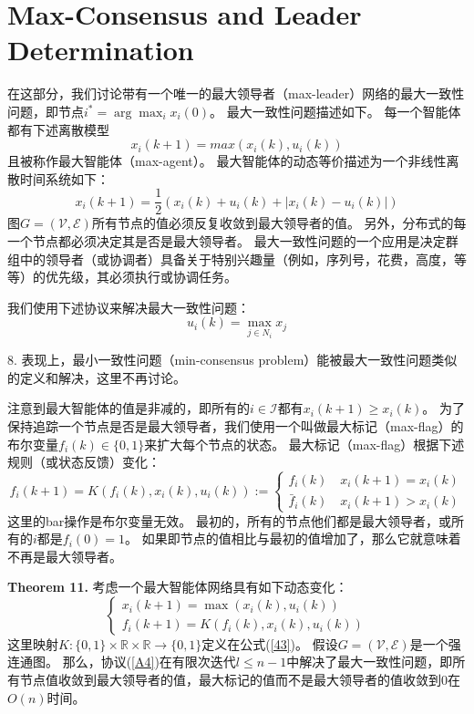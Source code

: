 \documentclass{article}
\begin{document}
\section{Max-Consensus and Leader Determination}
在这部分，我们讨论带有一个唯一的最大领导者（max-leader）网络的最大一致性问题，即节点$i^*=\arg\max_ix_i(0)$。
最大一致性问题描述如下。
每一个智能体都有下述离散模型
\begin{equation}
    \tag{41}
    \label{41}
    x_i(k+1)=max(x_i(k),u_i(k))
\end{equation}
且被称作最大智能体（max-agent）。
最大智能体的动态等价描述为一个非线性离散时间系统如下：
\begin{equation}
    \tag{42}
    \label{42}
    x_i(k+1) = \frac{1}{2}(x_i(k)+u_i(k)+|x_i(k)-u_i(k)|)
\end{equation}
图$G=(\mathcal{V},\mathcal{E})$所有节点的值必须反复收敛到最大领导者的值。
另外，分布式的每一个节点都必须决定其是否是最大领导者。
最大一致性问题的一个应用是决定群组中的领导者（或协调者）具备关于特别兴趣量（例如，序列号，花费，高度，等等）的优先级，其必须执行或协调任务。

我们使用下述协议来解决最大一致性问题：
\begin{equation}
    \tag{A4}
    \label{A4}
    u_i(k) = \max_{j\in N_i}x_j
\end{equation}

 8. 表现上，最小一致性问题（min-consensus problem）能被最大一致性问题类似的定义和解决，这里不再讨论。

注意到最大智能体的值是非减的，即所有的$i\in\mathcal{I}$都有$x_i(k+1)\ge x_i(k)$。
为了保持追踪一个节点是否是最大领导者，我们使用一个叫做最大标记（max-flag）的布尔变量$f_i(k)\in\{0,1\}$来扩大每个节点的状态。
最大标记（max-flag）根据下述规则（或状态反馈）变化：
\begin{equation}
    \tag{43}
    \label{43}
    f_i(k+1) = K(f_i(k),x_i(k),u_i(k)):=
    \left\{
        \begin{matrix}
            f_i(k)\quad x_i(k+1)=x_i(k)\\
            \bar{f}_i(k) \quad x_i(k+1)>x_i(k)
        \end{matrix}
    \right.
\end{equation}
这里的bar操作是布尔变量无效。
最初的，所有的节点他们都是最大领导者，或所有的$i$都是$f_i(0)=1$。
如果即节点的值相比与最初的值增加了，那么它就意味着不再是最大领导者。

\noindent\textbf{Theorem 11.} 考虑一个最大智能体网络具有如下动态变化：
\begin{equation}
    \tag{44}
    \label{44}
    \left\{
        \begin{matrix}
            x_i(k+1) = \max(x_i(k),u_i(k))\\
            f_i(k+1) = K(f_i(k),x_i(k),u_i(k))
        \end{matrix}
    \right.
\end{equation}
这里映射$K:\{0,1\}\times \mathbb{R}\times\mathbb{R}\rightarrow\{0,1\}$定义在公式(\ref{43})。
假设$G=(\mathcal{V},\mathcal{E})$是一个强连通图。
那么，协议(\ref{A4})在有限次迭代$l\le n-1$中解决了最大一致性问题，即所有节点值收敛到最大领导者的值，最大标记的值而不是最大领导者的值收敛到0在$O(n)$时间。
\end{document}
